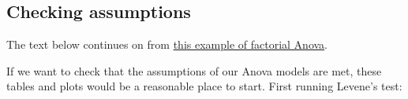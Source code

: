 \documentclass[]{article}
\newenvironment{Shaded}{\begin{snugshade}}{\end{snugshade}}
\newcommand{\KeywordTok}[1]{\textcolor[rgb]{0.13,0.29,0.53}{\textbf{#1}}}
\newcommand{\StringTok}[1]{\textcolor[rgb]{0.31,0.60,0.02}{#1}}
\newcommand{\OperatorTok}[1]{\textcolor[rgb]{0.81,0.36,0.00}{\textbf{#1}}}
\newcommand{\NormalTok}[1]{#1}
\theoremstyle{definition}
\theoremstyle{definition}
\theoremstyle{definition}
\theoremstyle{remark}
\begin{document}
\subsection*{Checking assumptions}\label{checking-assumptions}

{The text below continues on from
\protect\hyperlink{howell-factorial-example}{this example of factorial
Anova}.}

If we want to check that the assumptions of our Anova models are met,
these tables and plots would be a reasonable place to start. First
running Levene's test:

\begin{Shaded}
\end{Shaded}
\end{document}
